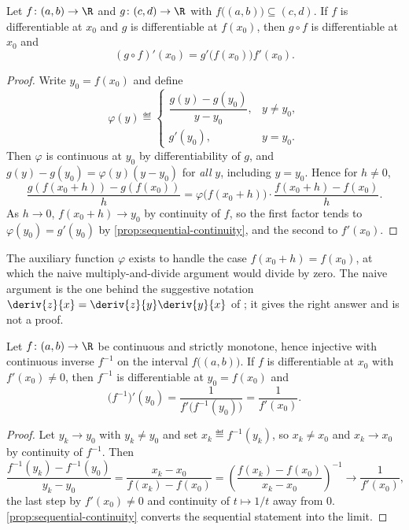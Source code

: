 \begin{proposition}\label{prop:chain-rule-1d}
	Let $f\colon(a,b)\to\R$ and $g\colon(c,d)\to\R$ with $f\bigl((a,b)\bigr)
		\subseteq(c,d)$. If $f$ is differentiable at $x_0$ and $g$ is differentiable at
	$f(x_0)$, then $g\circ f$ is differentiable at $x_0$ and
	\[
		(g\circ f)'(x_0)=g'\bigl(f(x_0)\bigr)f'(x_0).
	\]
\end{proposition}

\begin{proof}
	Write $y_0=f(x_0)$ and define
	\[
		\varphi(y)\eqdef
		\begin{cases}
			\dfrac{g(y)-g(y_0)}{y-y_0}, & y\neq y_0, \\[1.5ex]
			g'(y_0),                    & y=y_0 .
		\end{cases}
	\]
	Then $\varphi$ is continuous at $y_0$ by differentiability of $g$, and
	$g(y)-g(y_0)=\varphi(y)(y-y_0)$ for \emph{all} $y$, including $y=y_0$. Hence for
	$h\neq0$,
	\[
		\frac{g(f(x_0+h))-g(f(x_0))}{h}
		=\varphi\bigl(f(x_0+h)\bigr)\cdot\frac{f(x_0+h)-f(x_0)}{h}.
	\]
	As $h\to0$, $f(x_0+h)\to y_0$ by continuity of $f$, so the first factor tends to
	$\varphi(y_0)=g'(y_0)$ by \autoref{prop:sequential-continuity}, and the second
	to $f'(x_0)$.
\end{proof}

The auxiliary function $\varphi$ exists to handle the case $f(x_0+h)=f(x_0)$, at
which the naive multiply-and-divide argument would divide by zero. The naive
argument is the one behind the suggestive notation
$\deriv{z}{x}=\deriv{z}{y}\deriv{y}{x}$ of
\autocite[slide 18]{fukuda2026calculus}; it gives the right answer and is not a
proof.

\begin{proposition}\label{prop:inverse-derivative}
	Let $f\colon(a,b)\to\R$ be continuous and strictly monotone, hence injective
	with continuous inverse $f^{-1}$ on the interval $f\bigl((a,b)\bigr)$. If $f$
	is differentiable at $x_0$ with $f'(x_0)\neq0$, then $f^{-1}$ is differentiable
	at $y_0=f(x_0)$ and
	\[
		\bigl(f^{-1}\bigr)'(y_0)=\frac{1}{f'\bigl(f^{-1}(y_0)\bigr)}
		=\frac{1}{f'(x_0)} .
	\]
\end{proposition}

\begin{proof}
	Let $y_k\to y_0$ with $y_k\neq y_0$ and set $x_k\eqdef f^{-1}(y_k)$, so
	$x_k\neq x_0$ and $x_k\to x_0$ by continuity of $f^{-1}$. Then
	\[
		\frac{f^{-1}(y_k)-f^{-1}(y_0)}{y_k-y_0}
		=\frac{x_k-x_0}{f(x_k)-f(x_0)}
		=\left(\frac{f(x_k)-f(x_0)}{x_k-x_0}\right)^{-1}
		\longrightarrow\frac{1}{f'(x_0)},
	\]
	the last step by $f'(x_0)\neq0$ and continuity of $t\mapsto1/t$ away from $0$.
	\autoref{prop:sequential-continuity} converts the sequential statement into the
	limit.
\end{proof}

